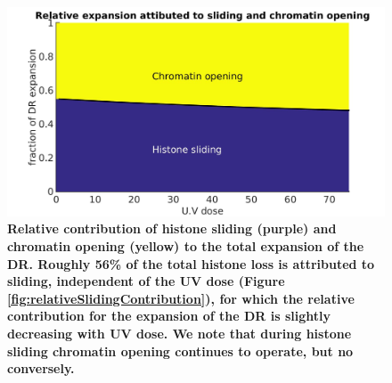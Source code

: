 \documentclass[12pt]{article}
\begin{document}
\begin{figure}[H]
\centering
\includegraphics[width=0.5\linewidth, height=0.3\textheight]{histoneAndDNARelativeExpansionContribution}
\caption{\textbf{Relative contribution of histone sliding (purple) and chromatin opening (yellow) to the total expansion of the DR. Roughly 56\% of the total histone loss is attributed to sliding, independent of the UV dose (Figure \ref{fig:relativeSlidingContribution}), for which the relative contribution for the expansion of the DR is slightly decreasing with UV dose. We note that during histone sliding chromatin opening continues to operate, but no conversely.}}
\label{fig:histoneAndDNARelativeExpansionContribution}
\end{figure}
\end{document}
